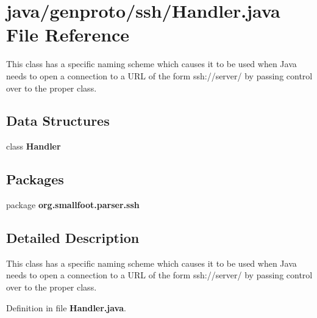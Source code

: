 \section{java/genproto/ssh/\+Handler.java File Reference}
\label{genproto_2ssh_2Handler_8java}


This class has a specific naming scheme which causes it to be used when Java needs to open a connection to a U\+R\+L of the form ssh\+://server/ by passing control over to the proper class.  


\subsection*{Data Structures}
\begin{DoxyCompactItemize}
\item 
class {\bf Handler}
\end{DoxyCompactItemize}
\subsection*{Packages}
\begin{DoxyCompactItemize}
\item 
package {\bf org.\+smallfoot.\+parser.\+ssh}
\end{DoxyCompactItemize}


\subsection{Detailed Description}
This class has a specific naming scheme which causes it to be used when Java needs to open a connection to a U\+R\+L of the form ssh\+://server/ by passing control over to the proper class. 



Definition in file {\bf Handler.\+java}.


